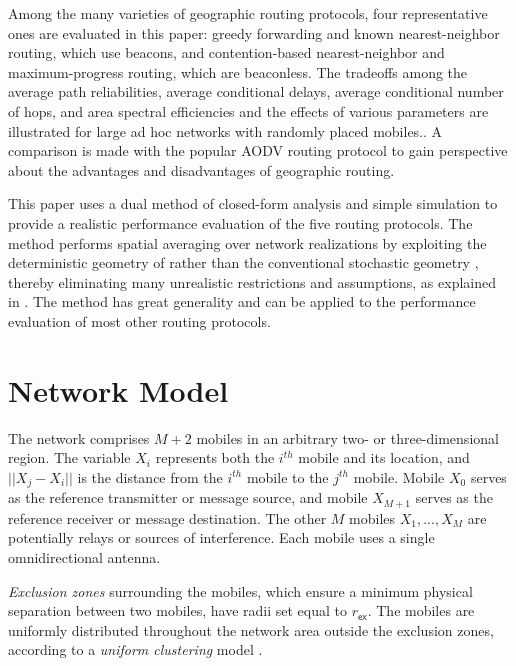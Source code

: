 \documentclass[conference]{IEEEtran}
\begin{document}
Among the many varieties of geographic routing protocols, four
representative ones are evaluated in this paper: greedy forwarding and known
nearest-neighbor routing, which use beacons, and contention-based
nearest-neighbor and maximum-progress routing, which are beaconless. The
tradeoffs among the average path reliabilities, average conditional delays,
average conditional number of hops, and area spectral efficiencies and the
effects of various parameters are illustrated for large ad hoc networks with
randomly placed mobiles.. A comparison is made with the popular AODV routing
protocol to gain perspective about the advantages and disadvantages of
geographic routing.

This paper uses a dual method of closed-form analysis and simple simulation to
provide a realistic performance evaluation of the five routing protocols. The
method performs spatial averaging over network realizations by exploiting the
deterministic geometry of \cite{tor} rather than the conventional stochastic
geometry \cite{haen}, thereby eliminating many unrealistic restrictions and
assumptions, as explained in \cite{tor4}. The method has great generality and
can be applied to the performance evaluation of most other routing protocols.

\section{Network Model}

The network comprises $M+2$ mobiles in an arbitrary two- or three-dimensional
region. The variable $X_{i}$ represents both the $i^{th}$ mobile and its
location, and $||X_{j}-X_{i}||$ is the distance from the $i^{th}$ mobile to
the $j^{th}$ mobile. Mobile $X_{0}$ serves as the reference transmitter or
message source, and mobile $X_{M+1}$ serves as the reference receiver or
message destination. The other $M$ mobiles $X_{1},...,X_{M}$ are potentially
relays or sources of interference. Each mobile uses a single omnidirectional antenna.

\emph{Exclusion zones} surrounding the mobiles, which ensure a minimum
physical separation between two mobiles, have radii set equal to
$r_{\mathsf{ex}}.$ The mobiles are uniformly distributed throughout the
network area outside the exclusion zones, according to a \textit{uniform
clustering} model \cite{tor1}.
\end{document}
